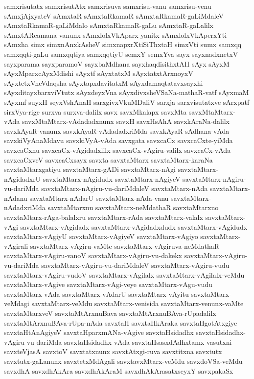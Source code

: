 {samxrisutatx
samxrisutAtx
samxrisuva
samxrisu-vanu
samxrisu-venu
sAmxjAjxyateV
sAmxtaR
sAmxtaRkamaR
sAmxtaRkamaR-gaLiMdaleV
sAmxtaRkamaR-gaLiMdalo
sAmxtaRkamaR-gaLu
sAmxtaR-gaLalilx
sAmxtARcamana-vanunx
sAmxlolxVkAparx-yanitx
sAmxlolxVkAperxYti
sAmxha
simx
simxnAnxkAsheV
simxnapxrXtiSiThxtaH
simxVti
sumx
samxqq
samxqqti-gaLu
samxqqtiya
samxqqtiyU
semxY
semxYva
sayx
sayxnadxnetxV
sayxparama
sayxparamoV
sayxbaMdhana
sayxhaqdisithxtAH
sAyx
sAyxM
sAyxMparxcAyxMdishi
sAyxtf
sAyxtatxM
sAyxtatxtArxnoyxV
sAyxtetxVneVdaqsha
sAyxtapxdavitatxM
sAyxdamaqtatavxsayxhi
sAyxditayxbarxviVtutx
sAyxdeyxVna
sAyxdivxsheVSaNa-mathaR-vatf
sAyxmaM
sAyxmf
suyxH
seyxVshAnaH
sarxgivxVkuMDaliV
sarxja
sarxvisutatxve
sArxpatf
sirxVya-rige
surxva
surxva-dalilx
savx
savxMkalapx
savxMta
savxMtaMtarx-vAda
savxMtaMtarx-vAdadadxnunx
savxH
savxHsAhA
savxkAraNa-dalilx
savxkAyaR-vanunx
savxkAyaR-vAdadadxriMda
savxkAyaR-sAdhana-vAda
savxkiVyAnaMdavu
savxkiVyA-vAda
savxgata
savxcaCx
savxcaCxte-yiMda
savxcaCxnu
savxcaCx-vAgidadxlilx
savxcaCx-vAgiru-valilx
savxcaCx-vAda
savxcaCxveV
savxcaCxsayx
savxta
savxtaMtarx
savxtaMtarx-karaNa
savxtaMtarxgatiyu
savxtaMtarx-gADi
savxtaMtarx-nAgi
savxtaMtarx-nAgidadxrU
savxtaMtarx-nAgidudx
savxtaMtarx-nAgiyeV
savxtaMtarx-nAgiru-vu-dariMda
savxtaMtarx-nAgiru-vu-dariMdaleV
savxtaMtarx-nAda
savxtaMtarx-nAdanu
savxtaMtarx-nAdarU
savxtaMtarx-nAda-vanu
savxtaMtarx-nAdadxriMda
savxtaMtarxnu
savxtaMtarx-neMdathaR
savxtaMtarxno
savxtaMtarx-rAga-balalxru
savxtaMtarx-rAda
savxtaMtarx-valalx
savxtaMtarx-vAgi
savxtaMtarx-vAgidadx
savxtaMtarx-vAgidadxdudx
savxtaMtarx-vAgidudx
savxtaMtarx-vAgiyU
savxtaMtarx-vAgiyeV
savxtaMtarx-vAgiyo
savxtaMtarx-vAgirali
savxtaMtarx-vAgiru-vaMte
savxtaMtarx-vAgiruva-neMdathaR
savxtaMtarx-vAgiru-vanoV
savxtaMtarx-vAgiru-vu-dakekx
savxtaMtarx-vAgiru-vu-dariMda
savxtaMtarx-vAgiru-vu-dariMdaleV
savxtaMtarx-vAgiru-vudu
savxtaMtarx-vAgiru-vudoV
savxtaMtarx-vAgilalx
savxtaMtarx-vAgilalx-veMdu
savxtaMtarx-vAgive
savxtaMtarx-vAgi-veye
savxtaMtarx-vAgu-vudu
savxtaMtarx-vAda
savxtaMtarx-vAdarU
savxtaMtarx-vAyitu
savxtaMtarx-veMdagi
savxtaMtarx-veMdu
savxtaMtarx-venisida
savxtaMtarx-venunx-vaMte
savxtaMtarxveV
savxtaMtArxnuBava
savxtaMtArxnuBAva-rUpadalilx
savxtaMtArxnuBAva-rUpa-nAda
savxtaH
savxtaHkAraka
savxtaHgotAtxgiye
savxtaHtAnAgiyeV
savxtaHparxmANa-vAgive
savxtaHsidadhx
savxtaHsidadhx-vAgiru-vu-dariMda
savxtaHsidadhx-vAda
savxtaHsasxdAdhxtamx-vasutxni
savxteVjasA
savxtoV
savxtatxnunx
savxtAtxgi-ruva
savxtitxna
savxtutx
savxtutx-gaLanunx
savxtetxMdAgali
savxtavxMtarx-veMdu
savxdoVSa-veMdu
savxdhA
savxdhAkAra
savxdhAkAraM
savxdhAkArasatxseyxY
savxpakaSx
}
